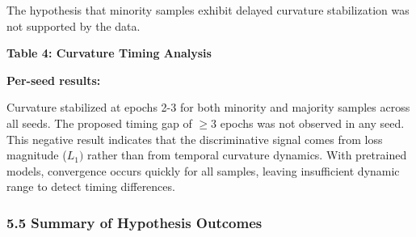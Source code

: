 The hypothesis that minority samples exhibit delayed curvature stabilization was not supported by the data.

\textbf{Table 4: Curvature Timing Analysis}

\begin{table}[htbp]
\centering
{}
\end{table}

\textbf{Per-seed results:}

\begin{table}[htbp]
\centering
{}
\end{table}

Curvature stabilized at epochs 2-3 for both minority and majority samples across all seeds. The proposed timing gap of $\geq 3$ epochs was not observed in any seed. This negative result indicates that the discriminative signal comes from loss magnitude ($L_{1})$ rather than from temporal curvature dynamics. With pretrained models, convergence occurs quickly for all samples, leaving insufficient dynamic range to detect timing differences.

\subsubsection{5.5 Summary of Hypothesis Outcomes}

\begin{table}[htbp]
\centering
{}
\end{table}
